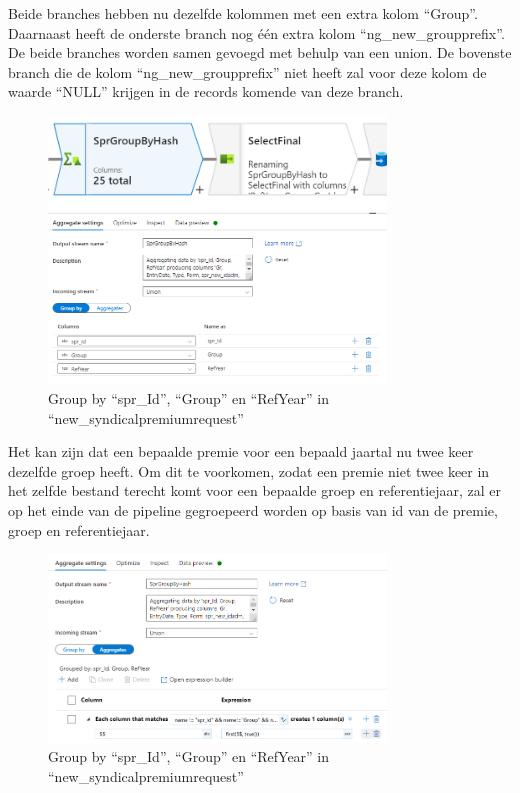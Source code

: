 Beide branches hebben nu dezelfde kolommen met een extra kolom ``Group''. Daarnaast heeft de onderste branch nog één extra kolom ``ng\_new\_groupprefix''. De beide branches worden samen gevoegd met behulp van een union. De bovenste branch die de kolom ``ng\_new\_groupprefix'' niet heeft zal voor deze kolom de waarde ``NULL'' krijgen in de records komende van deze branch. 

\begin{figure}[H]
    \centering
    \includegraphics[width=0.8\textwidth]{./graphics/adf/group_by_1.png}
    \caption{Group by ``spr\_Id'', ``Group'' en ``RefYear'' in ``new\_syndicalpremiumrequest''}
    \label{fig:groupby}
\end{figure}

Het kan zijn dat een bepaalde premie voor een bepaald jaartal nu twee keer dezelfde groep heeft. Om dit te voorkomen, zodat een premie niet twee keer in het zelfde bestand terecht komt voor een bepaalde groep en referentiejaar, zal er op het einde van de pipeline gegroepeerd worden op basis van id van de premie, groep en referentiejaar.

\begin{figure}[H]
    \centering
    \includegraphics[width=0.8\textwidth]{./graphics/adf/group_by_2.png}
    \caption{Group by ``spr\_Id'', ``Group'' en ``RefYear'' in ``new\_syndicalpremiumrequest''}
\end{figure}

